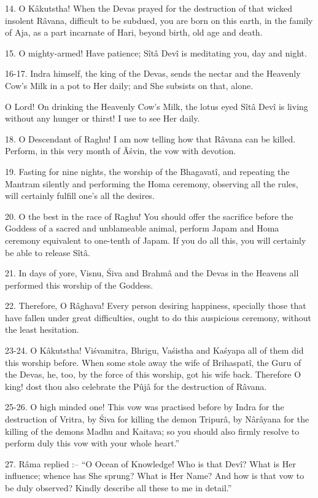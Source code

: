 14. O K\^akutstha! When the Devas prayed for the destruction of that wicked insolent R\^avana, difficult to be subdued, you are born on this earth, in the family of Aja, as a part incarnate of Hari, beyond birth, old age and death.

15. O mighty-armed! Have patience; S\^it\^a Dev\^i is meditating you, day and night.

16-17. Indra himself, the king of the Devas, sends the nectar and the Heavenly Cow's Milk in a pot to Her daily; and She subsists on that, alone.

O Lord! On drinking the Heavenly Cow's Milk, the lotus eyed S\^it\^a Dev\^i is living without any hunger or thirst! I use to see Her daily.

18. O Descendant of Raghu! I am now telling how that R\^avana can be killed. Perform, in this very month of Â\'svin, the vow with devotion.

19. Fasting for nine nights, the worship of the Bhagavat\^i, and repeating the Mantram silently and performing the Homa ceremony, observing all the rules, will certainly fulfill one's all the desires.

20. O the best in the race of Raghu! You should offer the sacrifice before the Goddess of a sacred and unblameable animal, perform Japam and Homa ceremony equivalent to one-tenth of Japam. If you do all this, you will certainly be able to release S\^it\^a.

21. In days of yore, Visnu, \'Siva and Brahm\^a and the Devas in the Heavens all performed this worship of the Goddess.

22. Therefore, O R\^aghava! Every person desiring happiness, specially those that have fallen under great difficulties, ought to do this auspicious ceremony, without the least hesitation.

23-24. O K\^akutstha! Vi\'svamitra, Bhrigu, Va\'sistha and Ka\'syapa all of them did this worship before. When some stole away the wife of Brihaspat\^i, the Guru of the Devas, he, too, by the force of this worship, got his wife back. Therefore O king! dost thou also celebrate the Pûj\^a for the destruction of R\^avana.

25-26. O high minded one! This vow was practised before by Indra for the destruction of Vritra, by \'Siva for killing the demon Tripur\^a, by N\^ar\^ayana for the killing of the demons Madhu and Kaitava; so you should also firmly resolve to perform duly this vow with your whole heart.''

27. R\^ama replied :-- ``O Ocean of Knowledge! Who is that Dev\^i? What is Her influence; whence has She sprung? What is Her Name? And how is that vow to be duly observed? Kindly describe all these to me in detail.''

